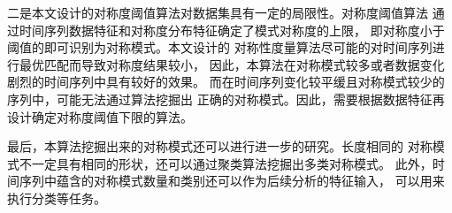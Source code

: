 二是本文设计的对称度阈值算法对数据集具有一定的局限性。对称度阈值算法
通过时间序列数据特征和对称度分布特征确定了模式对称度的上限，
即对称度小于阈值的即可识别为对称模式。本文设计的
对称性度量算法尽可能的对时间序列进行最优匹配而导致对称度结果较小，
因此，本算法在对称模式较多或者数据变化剧烈的时间序列中具有较好的效果。
而在时间序列变化较平缓且对称模式较少的序列中，可能无法通过算法挖掘出
正确的对称模式。因此，需要根据数据特征再设计确定对称度阈值下限的算法。

最后，本算法挖掘出来的对称模式还可以进行进一步的研究。长度相同的
对称模式不一定具有相同的形状，还可以通过聚类算法挖掘出多类对称模式。
此外，时间序列中蕴含的对称模式数量和类别还可以作为后续分析的特征输入，
可以用来执行分类等任务。




